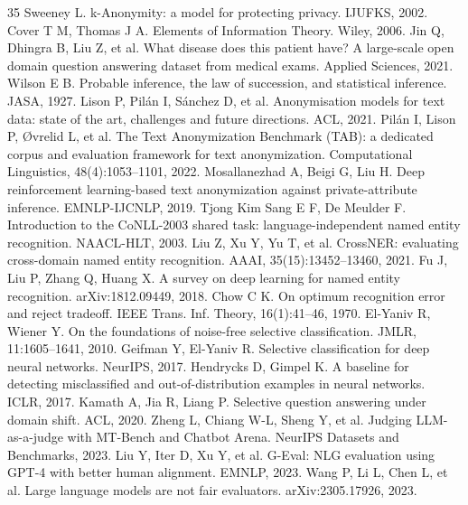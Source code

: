 \documentclass[journal]{IEEEtran}
\begin{document}
\begin{thebibliography}{35}
 Sweeney L. k-Anonymity: a model for protecting privacy. IJUFKS, 2002.
 Cover T M, Thomas J A. Elements of Information Theory. Wiley, 2006.
 Jin Q, Dhingra B, Liu Z, et al. What disease does this patient have? A large-scale open domain question answering dataset from medical exams. Applied Sciences, 2021.
 Wilson E B. Probable inference, the law of succession, and statistical inference. JASA, 1927.
 Lison P, Pil\'an I, S\'anchez D, et al. Anonymisation models for text data: state of the art, challenges and future directions. ACL, 2021.
 Pil\'an I, Lison P, {\O}vrelid L, et al. The Text Anonymization Benchmark (TAB): a dedicated corpus and evaluation framework for text anonymization. Computational Linguistics, 48(4):1053--1101, 2022.
 Mosallanezhad A, Beigi G, Liu H. Deep reinforcement learning-based text anonymization against private-attribute inference. EMNLP-IJCNLP, 2019.
 Tjong Kim Sang E F, De Meulder F. Introduction to the CoNLL-2003 shared task: language-independent named entity recognition. NAACL-HLT, 2003.
 Liu Z, Xu Y, Yu T, et al. CrossNER: evaluating cross-domain named entity recognition. AAAI, 35(15):13452--13460, 2021.
 Fu J, Liu P, Zhang Q, Huang X. A survey on deep learning for named entity recognition. arXiv:1812.09449, 2018.
 Chow C K. On optimum recognition error and reject tradeoff. IEEE Trans. Inf. Theory, 16(1):41--46, 1970.
 El-Yaniv R, Wiener Y. On the foundations of noise-free selective classification. JMLR, 11:1605--1641, 2010.
 Geifman Y, El-Yaniv R. Selective classification for deep neural networks. NeurIPS, 2017.
 Hendrycks D, Gimpel K. A baseline for detecting misclassified and out-of-distribution examples in neural networks. ICLR, 2017.
 Kamath A, Jia R, Liang P. Selective question answering under domain shift. ACL, 2020.
 Zheng L, Chiang W-L, Sheng Y, et al. Judging LLM-as-a-judge with MT-Bench and Chatbot Arena. NeurIPS Datasets and Benchmarks, 2023.
 Liu Y, Iter D, Xu Y, et al. G-Eval: NLG evaluation using GPT-4 with better human alignment. EMNLP, 2023.
 Wang P, Li L, Chen L, et al. Large language models are not fair evaluators. arXiv:2305.17926, 2023.
\end{thebibliography}
\end{document}
